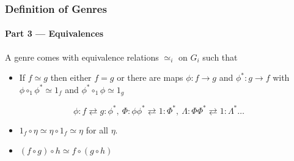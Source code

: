 \documentclass{beamer}
\begin{document}
\begin{frame}

\frametitle{Definition of Genres}

\framesubtitle{Part 3 --- Equivalences}

A genre comes with equivalence relations $\simeq_i$ on $G_i$ such that

\bigskip

\begin{itemize}

\item {} If $f \simeq g$ then either $f = g$ or there are maps $\phi: f \to g$ and $\phi^*: g \to f$ with $\phi \circ_1 \phi^* \simeq 1_f$ and $\phi^* \circ_1 \phi \simeq 1_g$

\end{itemize}

\bigskip

\begin{equation*}
\phi: f \rightleftarrows g: \phi^*, \: \Phi: \phi \phi^* \rightleftarrows 1: \Phi^*, \: \Lambda: \Phi \Phi^* \rightleftarrows 1 : \Lambda^* \ldots
\end{equation*}

\bigskip

\begin{itemize}
\item {} $1_f \circ \eta \simeq \eta \circ 1_f \simeq \eta$ for all $\eta$.

\medskip

\item {} $(f \circ g) \circ h \simeq f \circ (g \circ h)$

\end{itemize}


\end{frame}
\end{document}
